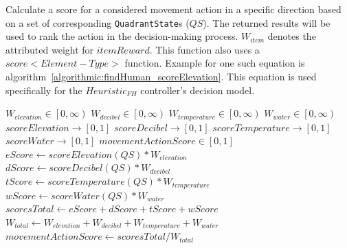 \begin{algorithm}[!htb]
  \caption[Heuristic - Score Potential Movement Action (Find Human)]{Calculate a score for a considered movement action in a specific direction based on a set of corresponding \texttt{QuadrantState}s ($QS$). The returned results will be used to rank the action in the decision-making process. $W_{item}$ denotes the attributed weight for $itemReward$. This function also uses a $score<Element-Type>$ function. Example for one such equation is algorithm~\ref{algorithmic:findHuman_scoreElevation}. This equation is used specifically for the $Heuristic_{FH}$ controller's decision model.}
  \begin{algorithmic} \label{algorithmic:findHuman_scoreMovmentAction}
    \REQUIRE $W_{elevation} \in \left[0, \infty \right)$
    \REQUIRE $W_{decibel} \in \left[0, \infty \right)$
    \REQUIRE $W_{temperature} \in \left[0, \infty \right)$
    \REQUIRE $W_{water} \in \left[0, \infty \right)$
    \ENSURE $scoreElevation \rightarrow \left[0, 1 \right]$
    \ENSURE $scoreDecibel \rightarrow \left[0, 1 \right]$
    \ENSURE $scoreTemperature \rightarrow \left[0, 1 \right]$
    \ENSURE $scoreWater \rightarrow \left[0, 1 \right]$
    \ENSURE $movementActionScore \in \left[0, 1 \right]$
    \STATE $eScore \leftarrow scoreElevation(QS) * W_{elevation}$
    \STATE $dScore \leftarrow scoreDecibel(QS) * W_{decibel}$
    \STATE $tScore \leftarrow scoreTemperature(QS) * W_{temperature}$
    \STATE $wScore \leftarrow scoreWater(QS) * W_{water}$
    \STATE $scoresTotal \leftarrow eScore + dScore + tScore + wScore$
    \STATE $W_{total} \leftarrow W_{elevation} + W_{decibel} + W_{temperature} + W_{water}$
    \RETURN $movementActionScore \leftarrow scoresTotal / W_{total}$
  \end{algorithmic}
\end{algorithm}


